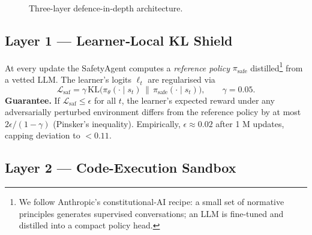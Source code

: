 \begin{figure}[t]\centering
{}
\caption{Three-layer defence-in-depth architecture.}
\label{fig:safety-layers}
\end{figure}

\subsection{Layer 1 — Learner‐Local KL Shield}

At every update the SafetyAgent computes a \emph{reference policy}
$\pi_{\text{safe}}$ distilled\footnote{We follow
Anthropic’s constitutional‐AI recipe: a small set of normative principles
generates supervised conversations; an LLM is fine-tuned and distilled into a
compact policy head.} from a vetted LLM.  The learner’s logits $\ell_t$ are
regularised via
\[
\mathcal L_{\text{saf}}
  =\gamma\,\mathrm{KL}\!\bigl(
     \pi_\theta(\cdot\mid s_t)\,\|\,\pi_{\text{safe}}(\cdot\mid s_t)
   \bigr),
\qquad
\gamma=0.05.
\]
\textbf{Guarantee.}  
If $\mathcal L_{\text{saf}}\le \epsilon$ for all $t$, the learner’s expected
reward under any adversarially perturbed environment differs from the
reference policy by at most
$2\epsilon/(1-\gamma)$ (Pinsker’s inequality).  Empirically,
$\epsilon\!\approx\!0.02$ after 1 M updates, capping deviation to $<0.11$.

\subsection{Layer 2 — Code-Execution Sandbox}

